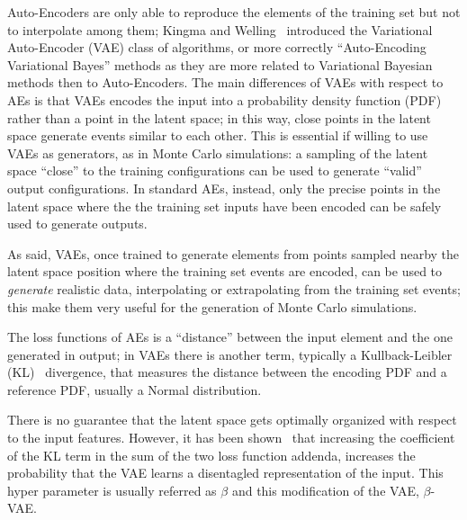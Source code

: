 Auto-Encoders are only able to reproduce the elements of the training set but not to interpolate among them; Kingma and Welling~\cite{Kingma2014} introduced the Variational Auto-Encoder (VAE) class of algorithms, or more correctly ``Auto-Encoding Variational Bayes'' methods as they are more related to Variational Bayesian methods then to Auto-Encoders.
The main differences of VAEs with respect to AEs is that VAEs encodes the input into a probability density function (PDF) rather than a point in the latent space; in this way, close points in the latent space generate events similar to each other.
This is essential if willing to use VAEs as generators, as in Monte Carlo simulations: a sampling of the latent space ``close'' to the training configurations can be used to generate ``valid'' output configurations. In standard AEs, instead, only the precise points in the latent space where the the training set inputs have been encoded can be safely used to generate outputs.

As said, VAEs, once trained to generate elements from points sampled nearby the latent space position where the training set events are encoded,
can be used to \emph{generate} realistic data, 
interpolating or extrapolating from the training set events; this make them very useful for the generation of Monte Carlo simulations.

The loss functions of AEs is a ``distance'' between the input element and the one generated in output; in VAEs there is another term, typically a Kullback-Leibler (KL)~\cite{Kullback1951} divergence, that measures the distance between the encoding PDF and a reference PDF, usually a Normal distribution.

There is no guarantee that the latent space gets optimally organized with respect to the input features. However, it has been shown~\cite{Kingma2019} that increasing the coefficient of the KL term in the sum of the two loss function addenda, increases the probability that the VAE learns a disentagled representation of the input. This hyper parameter is usually referred as $\beta$ and this modification of the VAE, $\beta$-VAE.


